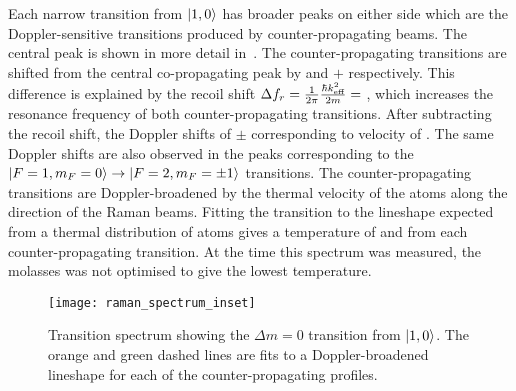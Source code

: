 \par\noindent
Each narrow transition from \(\ket{1,0}\) has broader
peaks on either side which are the Doppler-sensitive transitions
produced by counter-propagating beams.
The central peak is shown in more detail
in~. The counter-propagating
transitions are shifted from the central co-propagating peak by  and
\(+\) respectively. This difference is
explained by the recoil shift $\Delta f_r = \frac{1}{2\pi}\frac{\hbar
k^2_\textnormal{eff}}{2m} = $ , which increases
the resonance frequency of both counter-propagating transitions.
After subtracting the recoil shift, the Doppler shifts of
$\pm$ corresponding to
velocity of . The same Doppler shifts are also
observed in the peaks corresponding to the \(\ket{F=1,m_F = 0}
\rightarrow \ket{F=2,m_F=\pm 1}\) transitions. The counter-propagating transitions are
Doppler-broadened by the thermal velocity of the atoms along the direction
of the Raman beams. 
Fitting the transition to the lineshape expected
from a thermal distribution of atoms gives a temperature of
 and  from
each counter-propagating transition. At the time this spectrum was
measured, the molasses was not optimised to give the lowest
temperature.
\begin{figure}[htpb!]
  \centering
  \texttt{[image: raman\_spectrum\_inset]}
  \caption[\(\Delta m = 0\) transition spectrum.]{Transition spectrum showing the \(\Delta m = 0\) transition
  from \(\ket{1,0}\). The orange and green dashed lines are fits to a
Doppler-broadened lineshape for each of the counter-propagating
profiles.}
  \label{fig:raman_spectrum_inset}
\end{figure}

